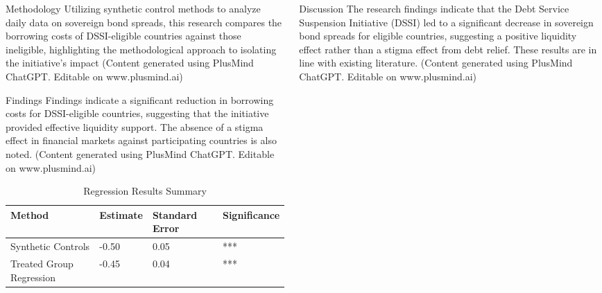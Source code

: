 \documentclass[final]{beamer}
\begin{document}
\begin{frame}[t]
\begin{columns}[T]
\begin{column}{.32\textwidth}
    \begin{block}{\Huge Methodology} %
    \Large %
     Utilizing synthetic control methods to analyze daily data on sovereign bond spreads, this research compares the borrowing costs of DSSI-eligible countries against those ineligible, highlighting the methodological approach to isolating the initiative's impact
    \normalsize (Content generated using PlusMind ChatGPT. Editable on www.plusmind.ai)
    \end{block}

    \vspace{1cm} %

    \begin{block}{\Huge Findings} %
    \Large %
   Findings indicate a significant reduction in borrowing costs for DSSI-eligible countries, suggesting that the initiative provided effective liquidity support. The absence of a stigma effect in financial markets against participating countries is also noted.
    \normalsize (Content generated using PlusMind ChatGPT. Editable on www.plusmind.ai)

    \begin{table}[H]
\centering
\caption{Regression Results Summary}
\begin{tabular}{llll}
\toprule
    Method & Estimate & Standard Error & Significance \\
    \midrule
    Synthetic Controls & -0.50 & 0.05 & *** \\
    Treated Group Regression & -0.45 & 0.04 & *** \\
    \bottomrule
\end{tabular}
\end{table}
    
    \end{block}
\end{column}

\begin{column}{.32\textwidth}
    \begin{block}{\Huge Discussion} %
    \Large %
 The research findings indicate that the Debt Service Suspension Initiative (DSSI) led to a significant decrease in sovereign bond spreads for eligible countries, suggesting a positive liquidity effect rather than a stigma effect from debt relief.  These results are in line with existing literature.
    \normalsize (Content generated using PlusMind ChatGPT. Editable on www.plusmind.ai)
    \end{block}


\end{column}
\end{columns}
\end{frame}
\end{document}

